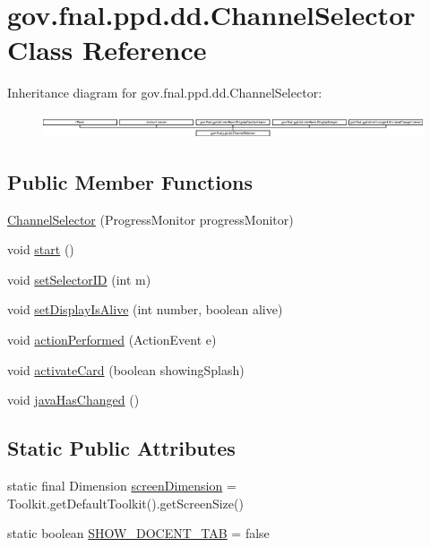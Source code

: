 \hypertarget{classgov_1_1fnal_1_1ppd_1_1dd_1_1ChannelSelector}{\section{gov.\-fnal.\-ppd.\-dd.\-Channel\-Selector Class Reference}
\label{classgov_1_1fnal_1_1ppd_1_1dd_1_1ChannelSelector}
}
Inheritance diagram for gov.\-fnal.\-ppd.\-dd.\-Channel\-Selector\-:\begin{figure}[H]
\begin{center}
\leavevmode
\includegraphics[height=0.711111cm]{classgov_1_1fnal_1_1ppd_1_1dd_1_1ChannelSelector}
\end{center}
\end{figure}
\subsection*{Public Member Functions}
\begin{DoxyCompactItemize}
\item 
\hyperlink{classgov_1_1fnal_1_1ppd_1_1dd_1_1ChannelSelector_a89e4bddacf4bcb255c41f3542273059e}{Channel\-Selector} (Progress\-Monitor progress\-Monitor)
\item 
void \hyperlink{classgov_1_1fnal_1_1ppd_1_1dd_1_1ChannelSelector_a9df07ecad4e75132a866bc81169e0df6}{start} ()
\item 
void \hyperlink{classgov_1_1fnal_1_1ppd_1_1dd_1_1ChannelSelector_a930233587284af74e0533faffc368804}{set\-Selector\-I\-D} (int m)
\item 
void \hyperlink{classgov_1_1fnal_1_1ppd_1_1dd_1_1ChannelSelector_ab92bc1ecd4b25b8a2a1fed26b57d4d57}{set\-Display\-Is\-Alive} (int number, boolean alive)
\item 
void \hyperlink{classgov_1_1fnal_1_1ppd_1_1dd_1_1ChannelSelector_a58d155d92e2b6f64d228cadc3b1039e9}{action\-Performed} (Action\-Event e)
\item 
void \hyperlink{classgov_1_1fnal_1_1ppd_1_1dd_1_1ChannelSelector_a637dbc852a236c96841cd5d5492a1079}{activate\-Card} (boolean showing\-Splash)
\item 
void \hyperlink{classgov_1_1fnal_1_1ppd_1_1dd_1_1ChannelSelector_ad73f42989480ef9af3f5ed0e1f5d364c}{java\-Has\-Changed} ()
\end{DoxyCompactItemize}
\subsection*{Static Public Attributes}
\begin{DoxyCompactItemize}
\item 
static final Dimension \hyperlink{classgov_1_1fnal_1_1ppd_1_1dd_1_1ChannelSelector_a78f6040f260da659faca3b09d0617e7e}{screen\-Dimension} = Toolkit.\-get\-Default\-Toolkit().get\-Screen\-Size()
\item 
static boolean \hyperlink{classgov_1_1fnal_1_1ppd_1_1dd_1_1ChannelSelector_ad9e88d31f70467252e90a59943338df0}{S\-H\-O\-W\-\_\-\-D\-O\-C\-E\-N\-T\-\_\-\-T\-A\-B} = false
\end{DoxyCompactItemize}
